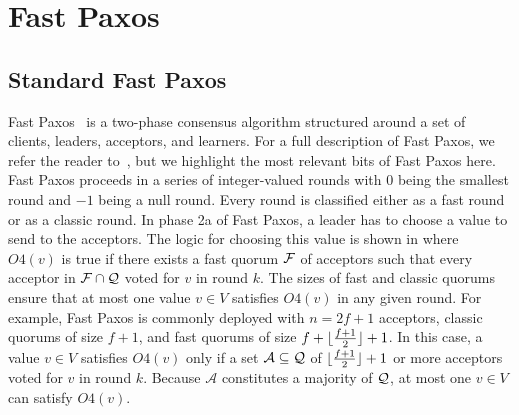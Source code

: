 \section{Fast Paxos}
\subsection{Standard Fast Paxos}
Fast Paxos~\cite{lamport2006fast} is a two-phase consensus algorithm structured
around a set of clients, leaders, acceptors, and learners. For a full
description of Fast Paxos, we refer the reader to~\cite{lamport2006fast}, but
we highlight the most relevant bits of Fast Paxos here. Fast Paxos proceeds in
a series of integer-valued rounds with $0$ being the smallest round and $-1$
being a null round. Every round is classified either as a fast round or as a
classic round. In phase 2a of Fast Paxos, a leader has to choose a value to
send to the acceptors. The logic for choosing this value is shown in
 where $O4(v)$ is true if there exists a fast quorum
$\mathcal{F}$ of acceptors such that every acceptor in $\mathcal{F} \cap
\mathcal{Q}$ voted for $v$ in round $k$. The sizes of fast and classic quorums
ensure that at most one value $v \in V$ satisfies $O4(v)$ in any given round.
For example, Fast Paxos is commonly deployed with $n = 2f + 1$ acceptors,
classic quorums of size $f + 1$, and fast quorums of size $f + \lfloor\frac{f + 1}{2}\rfloor + 1$.
In this case, a value $v \in V$ satisfies $O4(v)$ only if a set $\mathcal{A}
\subseteq \mathcal{Q}$ of $\lfloor\frac{f + 1}{2}\rfloor + 1$ or more acceptors voted for $v$ in
round $k$. Because $\mathcal{A}$ constitutes a majority of $\mathcal{Q}$, at most
one $v \in V$ can satisfy $O4(v)$.

